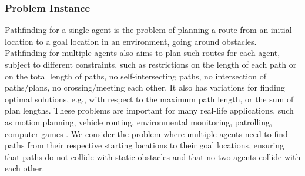 \documentclass[a4paper, titlepage]{article}
\begin{document}
\subsubsection{Problem Instance}
Pathfinding for a single agent is the problem of planning a 
route from an initial
location to a goal location in an environment, going around 
obstacles. 
Pathfinding for multiple agents also aims to plan such 
routes for each agent, 
subject to different constraints, such as restrictions on 
the length of each path 
or on the total length of paths, no self-intersecting 
paths, no intersection of 
paths/plans, no crossing/meeting each other.  It also has 
variations for finding optimal solutions, e.g., with 
respect 
to the maximum path length, or the sum of plan lengths. 
These problems are important
for many real-life applications, such as motion planning, 
vehicle routing, environmental monitoring, patrolling, 
computer games \cite{ekos2013}. We consider the 
problem 
where multiple agents need to find paths 
from their respective starting locations to their goal 
locations, ensuring that 
paths do not collide with static obstacles and that no two 
agents collide with 
each other. 
\end{document}
